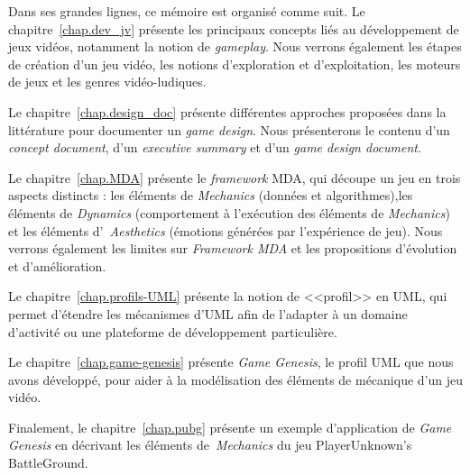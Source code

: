 \begin{introduction}
\begin{comment}
\end{comment}



Dans ses grandes lignes, ce m\'emoire est organis\'e comme suit.
Le chapitre~\ref{chap.dev_jv} pr\'esente les principaux concepts
li\'es au d\'eveloppement de jeux vid\'eos, notamment la notion de \emph{gameplay}.
Nous verrons également les étapes de création d'un jeu vidéo, les notions d'exploration et d'exploitation, les moteurs de jeux et les genres vidéo-ludiques. 

Le chapitre~\ref{chap.design_doc} pr\'esente diff\'erentes approches
propos\'ees dans la litt\'erature pour documenter un \emph{game design}.
Nous présenterons le contenu d'un \emph{concept document}, d'un \emph{executive summary} et d'un \emph{game design document}.

Le chapitre~\ref{chap.MDA} pr\'esente le \emph{framework} MDA, qui découpe un jeu en trois aspects distincts : les éléments de \emph{Mechanics} (données et algorithmes),les éléments de \emph{Dynamics} (comportement à l'exécution des éléments de \emph{Mechanics}) et les éléments d'~\emph{Aesthetics} (émotions générées par l'expérience de jeu). Nous verrons également les limites sur \emph{Framework MDA} et les propositions d'évolution et d'amélioration.

Le chapitre~\ref{chap.profils-UML} pr\'esente la notion de <<profil>>
en UML, qui permet d'étendre les mécanismes d'UML afin de l'adapter à un domaine d'activité ou une plateforme de développement particulière.

Le chapitre~\ref{chap.game-genesis} pr\'esente \emph{Game Genesis}, le
profil UML que nous avons d\'evelopp\'e, pour aider \`a la
mod\'elisation des \'el\'ements de m\'ecanique d'un jeu vid\'eo.

Finalement, le chapitre~\ref{chap.pubg} pr\'esente un exemple d'application de \emph{Game Genesis} en décrivant les éléments de~\emph{Mechanics} du jeu PlayerUnknown's BattleGround.




\end{introduction}

